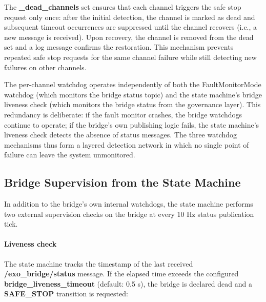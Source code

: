 The \textbf{\_dead\_channels} set ensures that each channel triggers the safe stop request only once: after the initial detection, the channel is marked as dead and subsequent timeout occurrences are suppressed until the channel recovers (i.e., a new message is received). Upon recovery, the channel is removed from the dead set and a log message confirms the restoration. This mechanism prevents repeated safe stop requests for the same channel failure while still detecting new failures on other channels.

The per-channel watchdog operates independently of both the FaultMonitorMode watchdog (which monitors the bridge status topic) and the state machine's bridge liveness check (which monitors the bridge status from the governance layer). This redundancy is deliberate: if the fault monitor crashes, the bridge watchdogs continue to operate; if the bridge's own publishing logic fails, the state machine's liveness check detects the absence of status messages. The three watchdog mechanisms thus form a layered detection network in which no single point of failure can leave the system unmonitored.

\subsection{Bridge Supervision from the State Machine}
In addition to the bridge's own internal watchdogs, the state machine performs two external supervision checks on the bridge at every 10 Hz status publication tick.

\paragraph{Liveness check} The state machine tracks the timestamp of the last received \textbf{/exo\_bridge/status} message. If the elapsed time exceeds the configured \newline \textbf{bridge\_liveness\_timeout} (default: 0.5 s), the bridge is declared dead and a \textbf{SAFE\_STOP} transition is requested:

